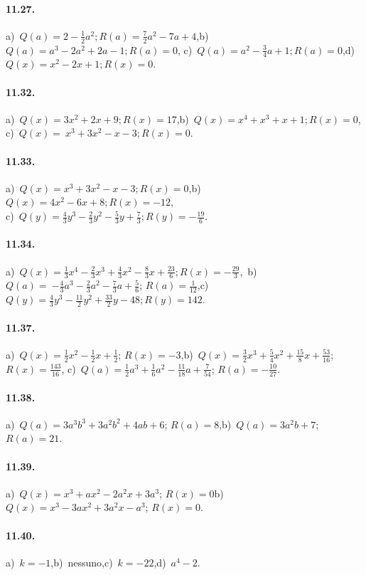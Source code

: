 \paragraph{11.27.}
a)~$Q(a)=2-\frac{1}{2}a^{2}; R(a)=\frac{7}{2}a^{2}-7a+4$,\quad b)~$Q(a)=a^{3}-2a^{2}+2a-1; R(a)=0$,\quad
c)~$Q(a)=a^{2}-\frac{3}{4}a+1; R(a)=0$,\quad d)~$Q(x)=x^{2}-2x+1; R(x)=0$.
\paragraph{11.32.}
a)~$Q(x)=3x^{2}+2x+9; R(x)=17$,\quad b)~$Q(x)=x^{4}+x^{3}+x+1; R(x)=0$, \protect\\ c)~$Q(x)=~x^{3}+3x^{2}-x-3; R(x)=0$.
\paragraph{11.33.}
a)~$Q(x)=x^{3}+3x^{2}-x-3; R(x)=0$,\quad b)~$Q(x)=4x^{2}-6x+8; R(x)=-12$,\protect\\ c)~$Q(y)=\frac{4}{3}y^{3}-\frac{2}{3}y^{2}-\frac{5}{3}y+\frac{7}{3}; R(y)=-\frac{19}{6}$.
\paragraph{11.34.}
a)~$Q(x)=\frac{1}{3}x^{4}-\frac{2}{3}x^{3}+\frac{4}{3}x^{2}-\frac{8}{3}x+\frac{23}{6}; R(x)=-\frac{29}{3}$,
\,b)~$Q(a)=~{-\frac{4}{3}a^{3}-\frac{2}{3}a^{2}-\frac{7}{3}a+\frac{5}{6}}$; $R(a)=\frac{1}{12}$,\quad c)~$Q(y)=\frac{4}{3}y^{3}-\frac{11}{2}y^{2}+\frac{33}{2}y-48; R(y)=142$.
\paragraph{11.37.}
a)~$Q(x)=\frac{1}{2}x^{2}-\frac{1}{2}x+\frac{1}{2}$; $R(x)=-3$,\quad b)~$Q(x)=\frac{3}{2}x^{3}+\frac{5}{4}x^{2}+\frac{15}{8}x+\frac{53}{16}$; $R(x)=\frac{143}{16}$,
\quad c)~$Q(a)=\frac{1}{2}a^{3}+\frac{1}{6}a^{2}-\frac{11}{18}a+\frac{7}{54}$; $R(a)=-{\frac{10}{27}}$.
\paragraph{11.38.}
a)~$Q(a)=3a^{3}b^{3}+3a^{2}b^{2}+4ab+6$; $R(a)=8$,\quad b)~$Q(a)=3a^{2}b+7$; $R(a)=21$.
\paragraph{11.39.}
a)~$Q(x)=x^{3}+ax^{2}-2a^{2}x+3a^{3}$; $R(x)=0$\quad b)~$Q(x)=x^3-3ax^2+3a^2 x-a^3$; $R(x)=0$.
\paragraph{11.40.}
a)~$k=-1$,\quad b)~nessuno,\quad c)~$k=-22$,\quad d)~$a^{4}-2$.
